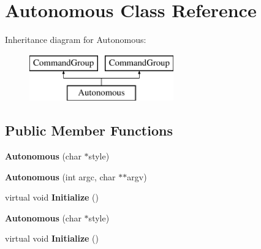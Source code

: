 \hypertarget{class_autonomous}{}\section{Autonomous Class Reference}
\label{class_autonomous}
Inheritance diagram for Autonomous\+:\begin{figure}[H]
\begin{center}
\leavevmode
\includegraphics[height=2.000000cm]{class_autonomous}
\end{center}
\end{figure}
\subsection*{Public Member Functions}
\begin{DoxyCompactItemize}
\item 
\hypertarget{class_autonomous_a1d40e572e145f77795f0061fd2bb8773}{}{\bfseries Autonomous} (char $\ast$style)\label{class_autonomous_a1d40e572e145f77795f0061fd2bb8773}

\item 
\hypertarget{class_autonomous_a55f5b6ad9641b9335c8569586877d17e}{}{\bfseries Autonomous} (int argc, char $\ast$$\ast$argv)\label{class_autonomous_a55f5b6ad9641b9335c8569586877d17e}

\item 
\hypertarget{class_autonomous_a29e2122506fb216d8f5624e18978b66b}{}virtual void {\bfseries Initialize} ()\label{class_autonomous_a29e2122506fb216d8f5624e18978b66b}

\item 
\hypertarget{class_autonomous_a1d40e572e145f77795f0061fd2bb8773}{}{\bfseries Autonomous} (char $\ast$style)\label{class_autonomous_a1d40e572e145f77795f0061fd2bb8773}

\item 
\hypertarget{class_autonomous_ae6d9a22cda53eb6c15b452f98656b2f1}{}virtual void {\bfseries Initialize} ()\label{class_autonomous_ae6d9a22cda53eb6c15b452f98656b2f1}

\end{DoxyCompactItemize}
